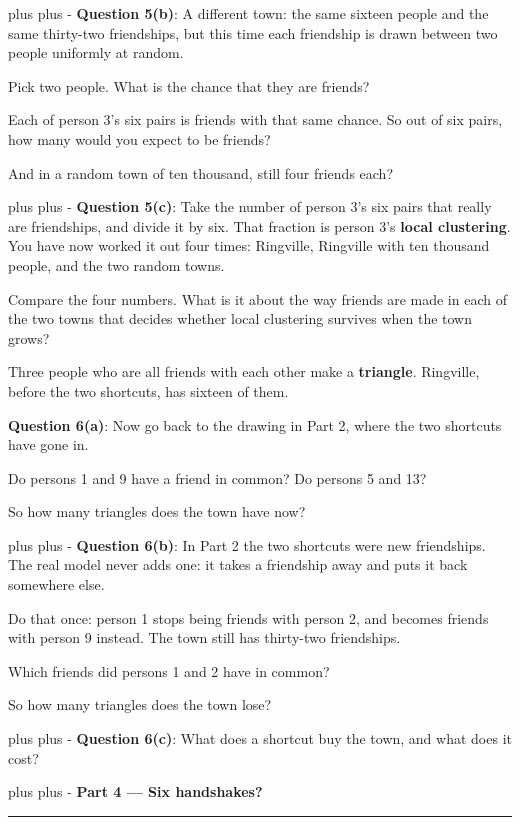 \documentclass[a4paper, 14pt]{extarticle}
\newcommand{\needroom}[1]{%
  \par
  \begingroup
    \setlength{\dimen0}{#1}%
    \vskip 0pt plus \dimen0
    \penalty -100%
    \vskip 0pt plus -\dimen0
  \endgroup}
\newcommand{\parthead}[2]{%
  \needroom{6\baselineskip}%
  \partheadhere{#1}{#2}}
\newcommand{\partheadhere}[2]{%
  \vspace{0.5em}
  {\large\bfseries Part #1 --- #2}\par
  \vspace{-0.4em}\rule{\textwidth}{0.8pt}\par
  \vspace{0.1em}}
\begin{document}
\needroom{3\baselineskip}%
{\bf Question 5(b)}: A different town: the same sixteen people and the same
thirty-two friendships, but this time each friendship is drawn between two
people uniformly at random.

Pick two people. What is the chance that they are friends?

Each of person 3's six pairs is friends with that same chance. So out of six
pairs, how many would you expect to be friends?

And in a random town of ten thousand, still four friends each?

\needroom{3\baselineskip}%
{\bf Question 5(c)}: Take the number of person 3's six pairs that really are
friendships, and divide it by six. That fraction is person 3's
\textbf{local clustering}. You have now worked it out four
times: Ringville, Ringville with ten thousand people, and the two random towns.

Compare the four numbers. What is it about the way friends are made in each of
the two towns that decides whether local clustering survives when the town
grows?

Three people who are all friends with each other make a \textbf{triangle}.
Ringville, before the two shortcuts, has sixteen of them.

{\bf Question 6(a)}: Now go back to the drawing in Part 2, where the two
shortcuts have gone in.

Do persons 1 and 9 have a friend in common? Do persons 5 and 13?

So how many triangles does the town have now?

\needroom{3\baselineskip}%
{\bf Question 6(b)}: In Part 2 the two shortcuts were new friendships. The real
model never adds one: it takes a friendship away and puts it back somewhere
else.

Do that once: person 1 stops being friends with person 2, and becomes friends
with person 9 instead. The town still has thirty-two friendships.

Which friends did persons 1 and 2 have in common?

So how many triangles does the town lose?

\needroom{3\baselineskip}%
{\bf Question 6(c)}: What does a shortcut buy the town, and what does it cost?

\parthead{4}{Six handshakes?}
\end{document}
